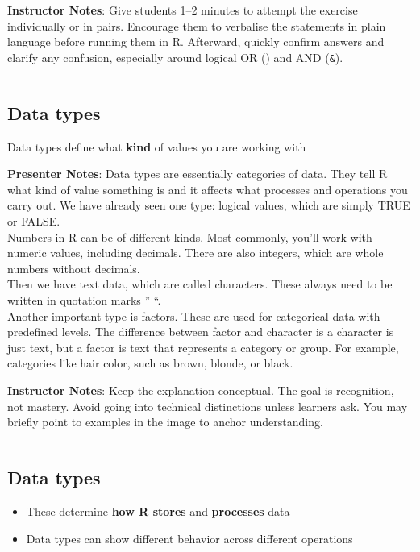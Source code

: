 \documentclass[
  letterpaper,
  DIV=11,
  numbers=noendperiod]{scrartcl}
\providecommand{\tightlist}{%
  \setlength{\itemsep}{0pt}\setlength{\parskip}{0pt}}
\begin{document}
\textbf{Instructor Notes}: Give students 1--2 minutes to attempt the
exercise individually or in pairs. Encourage them to verbalise the
statements in plain language before running them in R. Afterward,
quickly confirm answers and clarify any confusion, especially around
logical OR (\texttt{\textbar{}}) and AND (\texttt{\&}).

\begin{center}\rule{0.5\linewidth}{0.5pt}\end{center}

\subsection{Data types}\label{data-types}

Data types define what \textbf{kind} of values you are working with

\textbf{Presenter Notes}: Data types are essentially categories of data.
They tell R what kind of value something is and it affects what
processes and operations you carry out. We have already seen one type:
logical values, which are simply TRUE or FALSE.\\
Numbers in R can be of different kinds. Most commonly, you'll work with
numeric values, including decimals. There are also integers, which are
whole numbers without decimals.\\
Then we have text data, which are called characters. These always need
to be written in quotation marks '' ``.\\
Another important type is factors. These are used for categorical data
with predefined levels. The difference between factor and character is a
character is just text, but a factor is text that represents a category
or group. For example, categories like hair color, such as brown,
blonde, or black.

\textbf{Instructor Notes}: Keep the explanation conceptual. The goal is
recognition, not mastery. Avoid going into technical distinctions unless
learners ask. You may briefly point to examples in the image to anchor
understanding.

\begin{center}\rule{0.5\linewidth}{0.5pt}\end{center}

\subsection{Data types}\label{data-types-1}

\begin{itemize}
\tightlist
\item
  These determine \textbf{how R stores} and \textbf{processes} data
\item
  Data types can show different behavior across different operations
\end{itemize}
\end{document}
